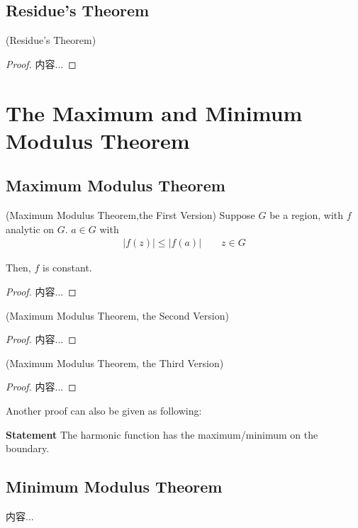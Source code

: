 \documentclass[Total.tex]{subfiles}
\begin{document}
			\subsection{Residue's Theorem}
				\begin{theorem}
					(Residue's Theorem)
				\end{theorem}
				\begin{proof}
					内容...
				\end{proof}
		\section{The Maximum and Minimum Modulus Theorem}
			\subsection{Maximum Modulus Theorem}
			\begin{theorem}
				(Maximum Modulus Theorem,the First Version) Suppose $G$ be a region, with $f$ analytic on $G$. $a\in G$ with 
				\begin{gather*}
					|f(z)|\leq |f(a)|\qquad z\in G
				\end{gather*}
				
				Then, $f$ is constant.
			\end{theorem}
			\begin{proof}
				内容...
			\end{proof}
			
			\begin{theorem}
				(Maximum Modulus Theorem, the Second Version)
			\end{theorem}
			\begin{proof}
				内容...
			\end{proof}
			
			\begin{theorem}
				(Maximum Modulus Theorem, the Third Version)
			\end{theorem}
			\begin{proof}
				内容...
			\end{proof}
			
			Another proof can also be given as following:
			
			\textbf{Statement} The harmonic function has the maximum/minimum on the boundary.
			
			
			\subsection{Minimum Modulus Theorem}
			\begin{theorem}
				内容...
			\end{theorem}
\end{document}
